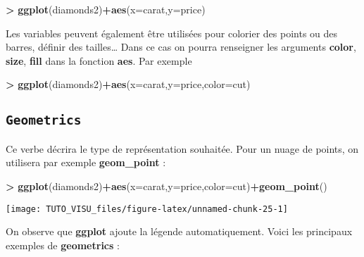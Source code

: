 \documentclass[]{book}
\newenvironment{Shaded}{\begin{snugshade}}{\end{snugshade}}
\newcommand{\DataTypeTok}[1]{\textcolor[rgb]{0.13,0.29,0.53}{#1}}
\newcommand{\KeywordTok}[1]{\textcolor[rgb]{0.13,0.29,0.53}{\textbf{#1}}}
\newcommand{\NormalTok}[1]{#1}
\newcommand{\OperatorTok}[1]{\textcolor[rgb]{0.81,0.36,0.00}{\textbf{#1}}}
\newcommand{\StringTok}[1]{\textcolor[rgb]{0.31,0.60,0.02}{#1}}
\theoremstyle{definition}
\theoremstyle{definition}
\theoremstyle{definition}
\theoremstyle{remark}
\begin{document}
\begin{Shaded}
\begin{Highlighting}[]
\OperatorTok{>}\StringTok{ }\KeywordTok{ggplot}\NormalTok{(diamonds2)}\OperatorTok{+}\KeywordTok{aes}\NormalTok{(}\DataTypeTok{x=}\NormalTok{carat,}\DataTypeTok{y=}\NormalTok{price)}
\end{Highlighting}
\end{Shaded}

Les variables peuvent également être utilisées pour colorier des points ou des barres, définir des tailles\ldots{} Dans ce cas on pourra renseigner les arguments \textbf{color}, \textbf{size}, \textbf{fill} dans la fonction \textbf{aes}. Par exemple

\begin{Shaded}
\begin{Highlighting}[]
\OperatorTok{>}\StringTok{ }\KeywordTok{ggplot}\NormalTok{(diamonds2)}\OperatorTok{+}\KeywordTok{aes}\NormalTok{(}\DataTypeTok{x=}\NormalTok{carat,}\DataTypeTok{y=}\NormalTok{price,}\DataTypeTok{color=}\NormalTok{cut)}
\end{Highlighting}
\end{Shaded}

\hypertarget{geometrics}{%
\subsection{\texorpdfstring{\texttt{Geometrics}}{Geometrics}}\label{geometrics}}

Ce verbe décrira le type de représentation souhaitée. Pour un nuage de points, on utilisera par exemple \textbf{geom\_point} :

\begin{Shaded}
\begin{Highlighting}[]
\OperatorTok{>}\StringTok{ }\KeywordTok{ggplot}\NormalTok{(diamonds2)}\OperatorTok{+}\KeywordTok{aes}\NormalTok{(}\DataTypeTok{x=}\NormalTok{carat,}\DataTypeTok{y=}\NormalTok{price,}\DataTypeTok{color=}\NormalTok{cut)}\OperatorTok{+}\KeywordTok{geom_point}\NormalTok{()}
\end{Highlighting}
\end{Shaded}

\begin{center}\texttt{[image: TUTO\_VISU\_files/figure-latex/unnamed-chunk-25-1]} \end{center}

On observe que \textbf{ggplot} ajoute la légende automatiquement. Voici les principaux exemples de \textbf{geometrics} :
\end{document}
